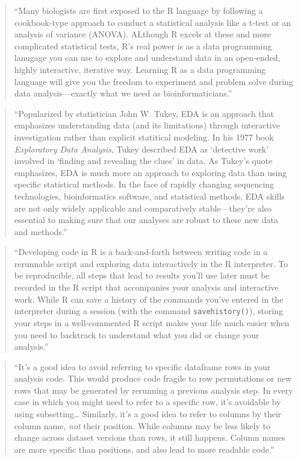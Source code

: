 \documentclass[]{tufte-book}
\begin{document}
\begin{quote}
``Many biologists are first exposed to the R language by following a cookbook-type
approach to conduct a statistical analysis like a t-test or an analysis of
variance (ANOVA). ALthough R excels at these and more complicated statistical
tests, R's real power is as a data programming lanugage you can use to explore and
understand data in an open-ended, highly interactive, iterative way. Learning R as a
data programming language will give you the freedom to experiment and problem solve
during data analysis---exactly what we need as bioinformaticians.'' \citep{buffalo2015bioinformatics}
\end{quote}

\begin{quote}
``Popularized by statistician John W. Tukey, EDA is an approach that emphasizes
understanding data (and its limitations) through interactive investigation
rather than explicit statitical modeling. In his 1977 book \emph{Exploratory Data
Analysis}, Tukey described EDA as `detective work' involved in `finding and
revealing the clues' in data. As Tukey's quote emphasizes, EDA is much more an approach
to exploring data than using specific statistical methods. In the face of rapidly
changing sequencing technologies, bioinformatics software, and statistical methods,
EDA skills are not only widely applicable and comparatively stable---they're also
essential to making sure that our analyses are robust to these new data and methods.''
\citep{buffalo2015bioinformatics}
\end{quote}

\begin{quote}
``Developing code in R is a back-and-forth between writing code in a rerunnable script
and exploring data interactively in the R interpreter. To be reproducible, all steps
that lead to results you'll use later must be recorded in the R script that accompanies
your analysis and interactive work. While R can save a history of the commands you've
entered in the interpreter during a session (with the command \texttt{savehistory()}),
storing your steps in a well-commented R script makes your life much easier when you
need to backtrack to understand what you did or change your analysis.'' \citep{buffalo2015bioinformatics}
\end{quote}

\begin{quote}
``It's a good idea to avoid referring to specific dataframe rows in your analysis code.
This would produce code fragile to row permutations or new rows that may be generated
by rerunning a previous analysis step. In every case in which you might need to refer
to a specific row, it's avoidable by using subsetting\ldots{} Similarly, it's a good idea
to refer to columns by their column name, \emph{not} their position. While columns may be
less likely to change across dataset versions than rows, it still happens. Column names
are more specific than positions, and also lead to more readable code.''
\citep{buffalo2015bioinformatics}
\end{quote}
\end{document}
